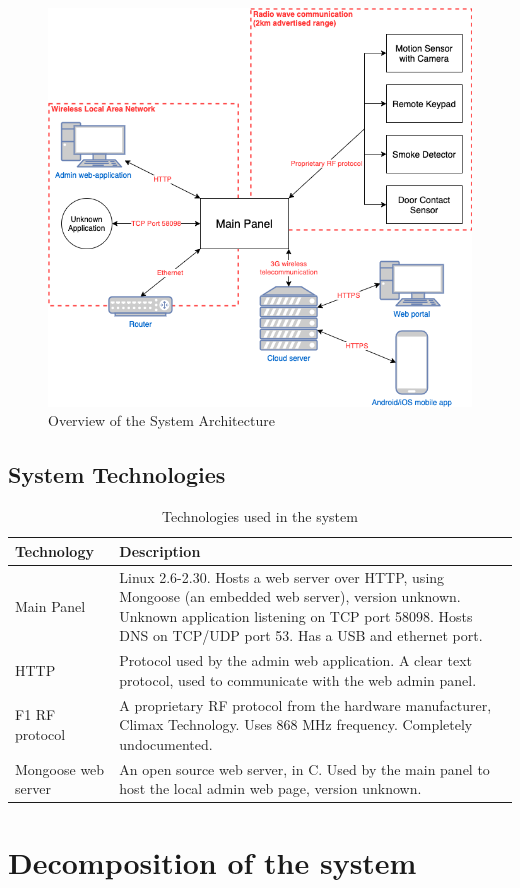 \begin{figure}[!ht]
    \centering
    \includegraphics[width=\textwidth]{images/system-overview.png}
    \caption{Overview of the System Architecture}
    \label{fig:system-overview}
\end{figure}

\subsection{System Technologies}
\begin{table}[!ht]
    \centering
    \begin{tabularx}{\textwidth}{l X}
        \textbf{Technology}  & \textbf{Description} \\
        \hline
        Main Panel & Linux 2.6-2.30. Hosts a web server over HTTP, using Mongoose (an embedded web server), version unknown. Unknown application listening on TCP port 58098. Hosts DNS on TCP/UDP port 53. Has a USB and ethernet port. \\
        \hline
        HTTP  & Protocol used by the admin web application. A clear text protocol, used to communicate with the web admin panel. \\
        \hline
        F1 RF protocol  & A proprietary \gls{RF} protocol from the hardware manufacturer, Climax Technology. Uses 868 MHz frequency. Completely undocumented. \\
        \hline
        Mongoose web server  & An open source web server, in C. Used by the main panel to host the local admin web page, version unknown. \\
        \hline
    \end{tabularx}
    \caption{Technologies used in the system}
    \label{tb:system-technologies}
\end{table}

\section{Decomposition of the system}
